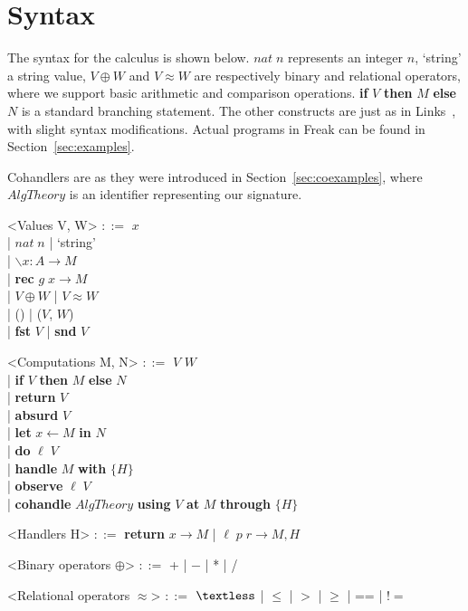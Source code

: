 \documentclass[declaration,shortabstract]{iithesis}
\theoremstyle{definition} \newtheorem{definition}{Definition}[chapter]
\theoremstyle{remark} \newtheorem{remark}[definition]{Observation}
\theoremstyle{plain} \newtheorem{theorem}[definition]{Theorem}
\theoremstyle{plain} \newtheorem{lemma}[definition]{Lemma}
\begin{document}
\section{Syntax}

    The syntax for the calculus is shown below. $nat \; n$ represents an integer $n$,
    `string' a string value, $V \oplus W$ and $V \approx W$ are respectively
    binary and relational operators, where we support basic arithmetic and
    comparison operations. \textbf{if} $V$ \textbf{then} $M$ \textbf{else} $N$
    is a standard branching statement. The other constructs are just as in
    Links~\cite{handlers-cps-journal}, with slight syntax modifications.
    Actual programs in Freak can be found in Section~\ref{sec:examples}.

    Cohandlers are as they were introduced in Section~\ref{sec:coexamples},
    where $AlgTheory$ is an identifier representing our signature.

    \begin{grammar}

        <Values V, W> $::=$ $ x $ \\
            | $nat \; n$ | `string'  \\
            | $ \backslash x : A \rightarrow M $ \\
            | \textbf{rec} $ g \; x \rightarrow M $\\
            | $V \oplus W$ | $V \approx W$ \\
            | () | ($V$, $W$) \\
            | \textbf{fst} $V$ | \textbf{snd} $V$

        <Computations M, N> $::=$ $ V $ $ W $ \\
            | \textbf{if} $V$ \textbf{then} $M$ \textbf{else} $N$ \\
            | \textbf{return} $V$ \\
            | \textbf{absurd} $ V $ \\
            | \textbf{let} $ x \leftarrow M $ \textbf{in} $ N $ \\
            | \textbf{do} $\ell \; V$ \\
            | \textbf{handle} $M$ \textbf{with} $ \{ H \} $ \\
            | \textbf{observe} $\ell \; V$ \\
            | \textbf{cohandle} $AlgTheory$ \textbf{using} $V$ \textbf{at} $M$ \textbf{through} $ \{ H \} $

        <Handlers H> $::=$ \textbf{return} $ x \rightarrow M $ | $ \ell \; p \; r \rightarrow M, H $

        <Binary operators $\oplus$> $::=$ + | $-$ | * | /

        <Relational operators $\approx$> $::=$ $ \textless $ | $\leqslant$ | $>$ | $\geqslant$ | == | $!= $

    \end{grammar}
\end{document}
